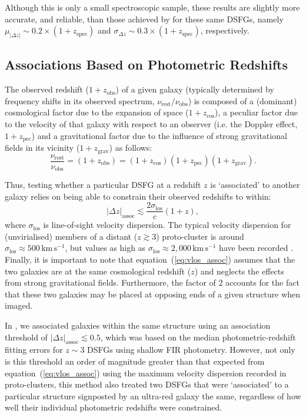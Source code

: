 \documentclass[a4paper, fleqn, usenatbib]{mnras}
\newcommand{\urg}{ultra-red galaxy}
\newcommand{\zspec}{z_{\text{spec}}}
\begin{document}
Although this is only a small spectroscopic sample, these results are slightly more accurate, and reliable, than those achieved by \citet{michalowski17} for these same DSFGs, namely $\mu_{|\Delta z|}\sim0.2\times(1+\zspec{})$ and $\sigma_{\Delta z}\sim0.3\times(1+\zspec{})$, respectively.

\subsection{Associations Based on Photometric Redshifts}

The observed redshift ($1 + z_{\text{obs}}$) of a given galaxy (typically determined by frequency shifts in its observed spectrum, $\nu_{\text{rest}}/\nu_{\text{obs}}$) is composed of a (dominant) cosmological factor due to the expansion of space ($1 + z_{\text{cos}}$), a peculiar factor due to the velocity of that galaxy with respect to an observer (i.e. the Doppler effect, $1+z_{\text{pec}}$) and a gravitational factor due to the influence of strong gravitational fields in its vicinity ($1+z_{\text{grav}}$) as follows:
\begin{equation}
    \label{eq:redshift}
    \frac{\nu_{\text{rest}}}{\nu_{\text{obs}}} = (1+z_{\text{obs}})
    = (1+z_{\text{cos}}) (1+z_{\text{pec}}) (1+z_{\text{grav}}).
\end{equation}

Thus, testing whether a particular DSFG at a redshift $z$ is `associated' to another galaxy relies on being able to constrain their observed redshifts to within:
\begin{equation}
    \label{eq:vlos_assoc}
    |\Delta z|_{\text{assoc}} \lesssim \frac{2\sigma_{\text{los}}}{c}(1+z),
\end{equation}
\noindent
where $\sigma_{\text{los}}$ is line-of-sight velocity dispersion.
The typical velocity dispersion for (unvirialised) members of a distant ($z\gtrsim3$) proto-cluster is around $\sigma_{\text{los}}\approx500\,\text{km}\,\text{s}^{-1}$, but values as high as $\sigma_{\text{los}}\approx2{,}000\,\text{km}\,\text{s}^{-1}$ have been recorded \citep{venemans07, dey16}.
Finally, it is important to note that equation~(\ref{eq:vlos_assoc}) assumes that the two galaxies are at the same cosmological redshift ($z$) and neglects the effects from strong gravitational fields.
Furthermore, the factor of $2$ accounts for the fact that these two galaxies may be placed at opposing ends of a given structure when imaged.

In , we associated galaxies within the same structure using an association threshold of $|\Delta z|_{\text{assoc}}\lesssim0.5$, which was based on the median photometric-redshift fitting errors for $z\sim3$ DSFGs using shallow FIR photometry.
However, not only is this threshold an order of magnitude greater than that expected from equation~(\ref{eq:vlos_assoc}) using the maximum velocity dispersion recorded in proto-clusters, this method also treated two DSFGs that were `associated' to a particular structure signposted by an \urg{} the same, regardless of how well their individual photometric redshifts were constrained.
\end{document}
